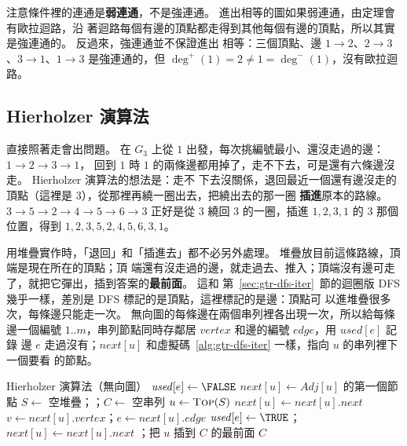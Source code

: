 注意條件裡的連通是\textbf{弱連通}，不是強連通。 進出相等的圖如果弱連通，由定理會有歐拉迴路，沿
著迴路每個有邊的頂點都走得到其他每個有邊的頂點，所以其實是強連通的。 反過來，強連通並不保證進出
相等：三個頂點、邊 $1 \to 2$、$2 \to 3$、$3 \to 1$、$1 \to 3$ 是強連通的，但
$\deg^{+}(1) = 2 \ne 1 = \deg^{-}(1)$，沒有歐拉迴路。

\subsection{Hierholzer 演算法}

直接照著走會出問題。 在 $G_3$ 上從 $1$ 出發，每次挑編號最小、還沒走過的邊：$1 \to 2 \to 3 \to 1$，
回到 $1$ 時 $1$ 的兩條邊都用掉了，走不下去，可是還有六條邊沒走。 Hierholzer 演算法的想法是：走不
下去沒關係，退回最近一個還有邊沒走的頂點（這裡是 $3$），從那裡再繞一圈出去，把繞出去的那一圈
\textbf{插進}原本的路線。 $3 \to 5 \to 2 \to 4 \to 5 \to 6 \to 3$ 正好是從 $3$ 繞回 $3$ 的一圈，插進
$1, 2, 3, 1$ 的 $3$ 那個位置，得到 $1, 2, 3, 5, 2, 4, 5, 6, 3, 1$。

用堆疊實作時，「退回」和「插進去」都不必另外處理。 堆疊放目前這條路線，頂端是現在所在的頂點；頂
端還有沒走過的邊，就走過去、推入；頂端沒有邊可走了，就把它彈出，插到答案的\textbf{最前面}。 這和
第~\ref{sec:gtr-dfs-iter}~節的迴圈版 DFS 幾乎一樣，差別是 DFS 標記的是頂點，這裡標記的是邊：頂點可
以進堆疊很多次，每條邊只能走一次。 無向圖的每條邊在兩個串列裡各出現一次，所以給每條邊一個編號
$1..m$，串列節點同時存鄰居 $\mathit{vertex}$ 和邊的編號 $\mathit{edge}$，用 $\mathit{used}[e]$ 記錄
邊 $e$ 走過沒有；$\mathit{next}[u]$ 和虛擬碼~\ref{alg:gtr-dfs-iter} 一樣，指向 $u$ 的串列裡下一個要看
的節點。

\begin{pseudo}[label=alg:gtr-hierholzer]{Hierholzer 演算法（無向圖）}
        \State $\mathit{used}[e] \gets \FALSE$
    \EndFor
        \State $\mathit{next}[u] \gets \mathit{Adj}[u]$ 的第一個節點
    \EndFor
    \State $S \gets$ 空堆疊；；$C \gets$ 空串列
        \State $u \gets \Call{Top}{S}$
            \State $\mathit{next}[u] \gets \mathit{next}[u].\mathit{next}$ 
        \EndWhile
            \State $v \gets \mathit{next}[u].\mathit{vertex}$；$e \gets \mathit{next}[u].\mathit{edge}$
            \State $\mathit{used}[e] \gets \TRUE$；$\mathit{next}[u] \gets \mathit{next}[u].\mathit{next}$
            \State {} 
        \Else
            \State {}；把 $u$ 插到 $C$ 的最前面
        \EndIf
    \EndWhile
    \State \Return $C$
\EndFunction
\end{pseudo}


